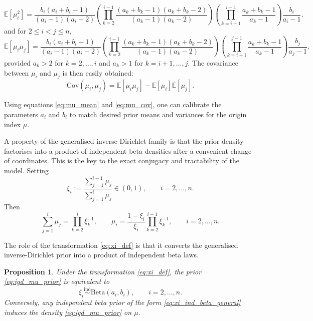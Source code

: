 \documentclass[11pt]{article}
\newtheorem{proposition}[theorem]{Proposition}
\newcommand{\1}{\mathbf{1}}
\newcommand{\BetaD}{\mathrm{Beta}}
\begin{document}
\begin{equation}
\mathbb{E}[\mu_i^2]
=
\frac{b_i(a_i+b_i-1)}{(a_i-1)(a_i-2)}
\left(
\prod_{k=2}^{i-1}
\frac{(a_k+b_k-1)(a_k+b_k-2)}{(a_k-1)(a_k-2)}
\right)
\left(
\prod_{k=i+1}^{i-1}
\frac{a_k+b_k-1}{a_k-1}
\right)
\frac{b_i}{a_i-1},
\end{equation}
and for $2\le i<j\le n$,
\begin{equation}
\mathbb{E}[\mu_i\mu_j]
=
\frac{b_i(a_i+b_i-1)}{(a_i-1)(a_i-2)}
\left(
\prod_{k=2}^{i-1}
\frac{(a_k+b_k-1)(a_k+b_k-2)}{(a_k-1)(a_k-2)}
\right)
\left(
\prod_{k=i+1}^{j-1}
\frac{a_k+b_k-1}{a_k-1}
\right)
\frac{b_j}{a_j-1},
\end{equation}
provided $a_k>2$ for $k=2,\dots,i$ and $a_k>1$ for $k=i+1,\dots,j$.
The covariance between $\mu_i$ and $\mu_j$ is then easily obtained:
\begin{equation}
\mathrm{Cov}(\mu_i,\mu_j)
=
\mathbb{E}[\mu_i\mu_j]-\mathbb{E}[\mu_i]\mathbb{E}[\mu_j].
\label{eq:mu_cov}
\end{equation}

Using equations \eqref{eq:mu_mean} and \eqref{eq:mu_cov}, 
one can calibrate the parameters $a_i$ and $b_i$ to match desired prior means and 
variances for the origin index $\mu$.

A property of the generalised inverse-Dirichlet family is that the prior density factorises into a product of independent beta densities after a convenient change of coordinates. This is the key to the exact conjugacy and tractability of the model.
Setting
\begin{equation}
\xi_i:=\frac{\sum_{j=1}^{i-1} \mu_j}{\sum_{j=1}^i \mu_j}\in(0,1),
\qquad i=2,\dots,n.
\label{eq:xi_def}
\end{equation}
Then
\begin{equation}
\sum_{j=1}^i\mu_j=\prod_{k=2}^i \xi_k^{-1},
\qquad
\mu_i=\frac{1-\xi_i}{\xi_i}\prod_{k=2}^{i-1}\xi_k^{-1},
\qquad i=2,\dots,n.
\label{eq:M_mu_from_xi}
\end{equation}

The role of the transformation \eqref{eq:xi_def} is that it converts the generalised inverse-Dirichlet prior into a product of independent beta laws.

\begin{proposition}\label{prop:igd_beta_equiv}
Under the transformation \eqref{eq:xi_def}, the prior \eqref{eq:igd_mu_prior} is equivalent to
\begin{equation}
\xi_i \stackrel{\mathrm{ind}}{\sim} \BetaD(a_i,b_i),
\qquad i=2,\dots,n.
\label{eq:xi_ind_beta_general}
\end{equation}
Conversely, any independent beta prior of the form \eqref{eq:xi_ind_beta_general} induces the density \eqref{eq:igd_mu_prior} on $\mu$.
\end{proposition}
\end{document}
